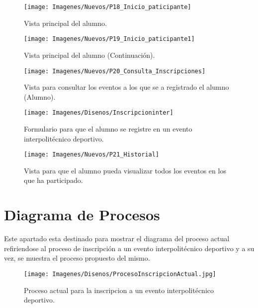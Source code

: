 		\begin{figure} [hbt!]
			\centering
			\texttt{[image: Imagenes/Nuevos/P18\_Inicio\_paticipante]}
			\caption{Vista principal del alumno.}
			\label{principalalum}
		\end{figure}
		
		\begin{figure} [hbt!]
			\centering
			\texttt{[image: Imagenes/Nuevos/P19\_Inicio\_paticipante1]}
			\caption{Vista principal del alumno (Continuación).}
			\label{principalalum1}
		\end{figure}
	
		\begin{figure} [hbt!]
			\centering
			\texttt{[image: Imagenes/Nuevos/P20\_Consulta\_Inscripciones]}
			\caption{Vista para consultar los eventos a los que se a registrado el alumno (Alumno).}
			\label{consultainscripcion}
		\end{figure}
	\pagebreak
		
		\begin{figure} [hbt!]
			\centering
			\texttt{[image: Imagenes/Disenos/Inscripcioninter]}
			\caption{Formulario para que el alumno se registre en un evento interpolitécnico deportivo.}
			\label{Inscripcioninterpolitecnico}
		\end{figure}
		

		\begin{figure} [hbt!]
			\centering
			\texttt{[image: Imagenes/Nuevos/P21\_Historial]}
			\caption{Vista para que el alumno pueda visualizar todos los eventos en los que ha participado.}
			\label{historial}
		\end{figure}

	\chapter{Diagrama de Procesos}	
		\noindent Este apartado esta destinado para mostrar el diagrama del proceso actual refiriendose al proceso de inscripción a un evento interpolitécnico deportivo y a su vez, se muestra el proceso propuesto del mismo.
		
		\begin{figure}[hbt!]
			\centering
			\texttt{[image: Imagenes/Disenos/ProcesoInscripcionActual.jpg]}
			\caption{Proceso actual para la inscripcion a un evento interpolitécnico deportivo.}
			\label{ProcesoInscripcionActual}
		\end{figure}
	\pagebreak
	

